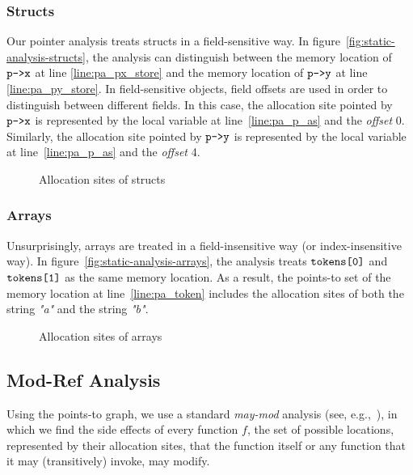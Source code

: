 \subsubsection{Structs}
Our pointer analysis treats structs in a field-sensitive way.
In figure~\ref{fig:static-analysis-structs},
the analysis can distinguish between the memory location of $\texttt{p->x}$ at line \ref{line:pa_px_store}
and the memory location of $\texttt{p->y}$ at line \ref{line:pa_py_store}.
In field-sensitive objects, field offsets are used in order to distinguish between different fields.
In this case, the allocation site pointed by $\texttt{p->x}$ is represented by
the local variable at line~\ref{line:pa_p_as} and the \textit{offset} 0.
Similarly, the allocation site pointed by $\texttt{p->y}$ is represented by
the local variable at line~\ref{line:pa_p_as} and the \textit{offset} 4.

\begin{figure*}[t]
  \centering
  \subfloat[]{
    
    \label{fig:static-analysis-structs}
  }
  \caption{Allocation sites of structs}
  \label{fig:simple-structs}
\end{figure*}

\subsubsection{Arrays}
Unsurprisingly, arrays are treated in a field-insensitive way (or index-insensitive way).
In figure~\ref{fig:static-analysis-arrays},
the analysis treats $\texttt{tokens[0]}$ and $\texttt{tokens[1]}$ as the same memory location.
As a result, the points-to set of the memory location at line~\ref{line:pa_token}
includes the allocation sites of both the string \textit{"a"} and the string \textit{"b"}.

\begin{figure*}[t]
  \centering
  \subfloat[]{
    
    \label{fig:static-analysis-arrays}
  }
  \caption{Allocation sites of arrays}
  \label{fig:simple-arrays}
\end{figure*}

\subsection{Mod-Ref Analysis}
Using the points-to graph, we use a
standard \emph{may-mod} analysis (see, e.g.,~\cite{dragon-book}), in
which we find the side effects of every function $f$, \ie the set of
possible locations, represented by their allocation sites, that the
function itself or any function that it may (transitively) invoke, may
modify.


